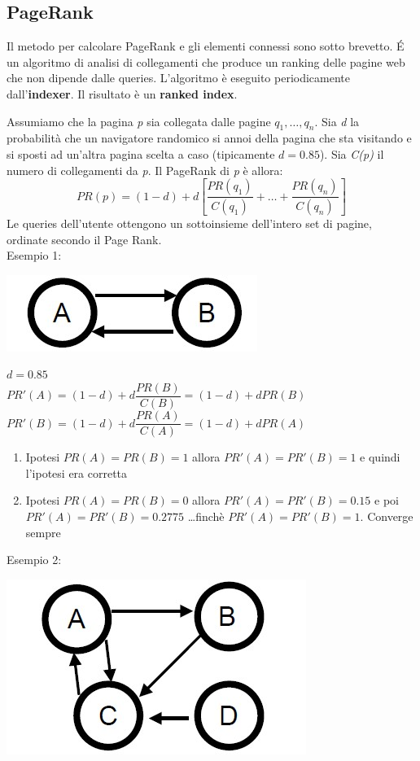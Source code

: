 \subsection{PageRank}
Il metodo per calcolare PageRank e gli elementi connessi sono sotto brevetto. \'E un algoritmo di analisi di collegamenti che produce un ranking delle pagine web che non dipende dalle queries. L'algoritmo è eseguito periodicamente dall'\textbf{indexer}. Il risultato è un \textbf{ranked index}. 

Assumiamo che la pagina \emph{p} sia collegata dalle pagine $q_1, \dots, q_n$. Sia \emph{d} la probabilità che un navigatore randomico si annoi della pagina che sta visitando e si sposti ad un'altra pagina scelta a caso (tipicamente $d=0.85$). Sia \emph{C(p)} il numero di collegamenti da \emph{p}. Il PageRank di \emph{p} è allora:
\[
PR(p) = (1 - d) + d\left[\frac{PR(q_1)}{C(q_1)} + \dots + \frac{PR(q_n)}{C(q_n)}\right]
\]
Le queries dell'utente ottengono un sottoinsieme dell'intero set di pagine, ordinate secondo il Page Rank.\\

\noindent Esempio 1:
\begin{center}
    \includegraphics[scale=0.4]{Images/TecnologieWeb/7/AB.jpg}
\end{center}

\noindent$d = 0.85$\\

\noindent$PR'(A) = (1 - d) + d\dfrac{PR(B)}{C(B)} = (1-d) + dPR(B)$\\
$PR'(B) = (1 - d) + d\dfrac{PR(A)}{C(A)} = (1-d) + dPR(A)$\\

\begin{enumerate}
    \item Ipotesi $PR(A) = PR(B) = 1$ allora $PR'(A) = PR'(B) = 1$ e quindi l'ipotesi era corretta
    \item Ipotesi $PR(A) = PR(B) = 0$ allora $PR'(A) = PR'(B) = 0.15$ e poi $PR'(A) = PR'(B) = 0.2775$ \dots finchè $PR'(A) = PR'(B) = 1$. Converge sempre 
\end{enumerate}\vspace{0.2cm}

\noindent Esempio 2:
\begin{center}
    \includegraphics[scale=0.4]{Images/TecnologieWeb/7/PageRank.jpg}
\end{center}

